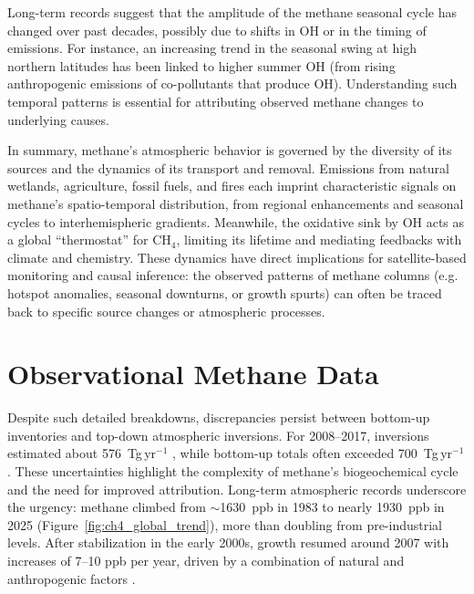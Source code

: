 Long-term records suggest that the amplitude of the methane seasonal cycle has changed over past decades, possibly due to shifts in OH or in the timing of emissions. For instance, an increasing trend in the seasonal swing at high northern latitudes has been linked to higher summer OH (from rising anthropogenic emissions of co-pollutants that produce OH). Understanding such temporal patterns is essential for attributing observed methane changes to underlying causes.

In summary, methane's atmospheric behavior is governed by the diversity of its sources and the dynamics of its transport and removal. Emissions from natural wetlands, agriculture, fossil fuels, and fires each imprint characteristic signals on methane's spatio-temporal distribution, from regional enhancements and seasonal cycles to interhemispheric gradients. Meanwhile, the oxidative sink by OH acts as a global ``thermostat'' for CH$_4$, limiting its lifetime and mediating feedbacks with climate and chemistry. These dynamics have direct implications for satellite-based monitoring and causal inference: the observed patterns of methane columns (e.g. hotspot anomalies, seasonal downturns, or growth spurts) can often be traced back to specific source changes or atmospheric processes.

\section{Observational Methane Data}
\label{sec:methane_atmosphere}

Despite such detailed breakdowns, discrepancies persist between bottom-up inventories and top-down atmospheric inversions. For 2008--2017, inversions estimated about 576~Tg\,yr$^{-1}$ \cite{Saunois2020}, while bottom-up totals often exceeded 700~Tg\,yr$^{-1}$. These uncertainties highlight the complexity of methane's biogeochemical cycle and the need for improved attribution. Long-term atmospheric records underscore the urgency: methane climbed from $\sim$1630~ppb in 1983 to nearly 1930~ppb in 2025 (Figure~\ref{fig:ch4_global_trend}), more than doubling from pre-industrial levels. After stabilization in the early 2000s, growth resumed around 2007 with increases of 7--10 ppb per year, driven by a combination of natural and anthropogenic factors \cite{Shindell2012, Karoff2023}.

